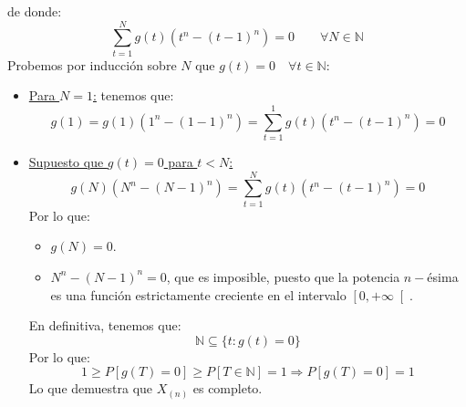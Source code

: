 \begin{ejercicio}
    de donde:
    \begin{equation*}
        \sum_{t=1}^{N}g(t)(t^n -{(t-1)}^{n}) = 0 \qquad \forall N\in \mathbb{N}
    \end{equation*}
    Probemos por inducción sobre $N$ que $g(t) = 0\quad \forall t\in \mathbb{N}$:
    \begin{itemize}
        \item \underline{Para $N=1$:} tenemos que:
            \begin{equation*}
                g(1) = g(1)(1^n-{(1-1)}^{n}) = \sum_{t=1}^{1}g(t) (t^n - {(t-1)}^{n}) = 0
            \end{equation*}
        \item \underline{Supuesto que $g(t) = 0$ para $t<N$:}
            \begin{equation*}
                g(N)(N^n - {(N-1)}^{n}) = \sum_{t=1}^{N}g(t)(t^n-{(t-1)}^{n}) = 0
            \end{equation*}
            Por lo que:
            \begin{itemize}
                \item $g(N) = 0$.
                \item $N^n - {(N-1)}^{n}=0$, que es imposible, puesto que la potencia $n-$ésima es una función estrictamente creciente en el intervalo $\left[0,+\infty\right[$.
            \end{itemize}
            En definitiva, tenemos que:
            \begin{equation*}
                \mathbb{N} \subseteq \{t:g(t) = 0\}
            \end{equation*}
            Por lo que:
            \begin{equation*}
                1 \geq P[g(T) = 0] \geq P[T \in \mathbb{N}] = 1 \Longrightarrow P[g(T)= 0] = 1
            \end{equation*}
            Lo que demuestra que $X_{(n)}$ es completo.
    \end{itemize}
\end{ejercicio}

